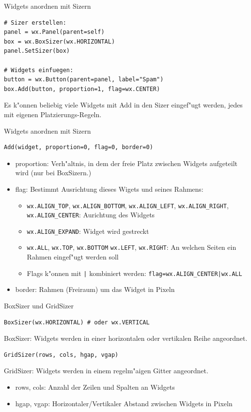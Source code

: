\begin{frame}[fragile]{Widgets anordnen mit Sizern}
\begin{lstlisting}[syle=Python]
# Sizer erstellen:
panel = wx.Panel(parent=self)
box = wx.BoxSizer(wx.HORIZONTAL)
panel.SetSizer(box)

# Widgets einfuegen:
button = wx.Button(parent=panel, label="Spam")
box.Add(button, proportion=1, flag=wx.CENTER)
\end{lstlisting}
Es k"onnen beliebig viele Widgets mit \alert{Add} in den Sizer eingef"ugt werden, jedes mit eigenen Platzierungs-Regeln.
\end{frame}


\begin{frame}[fragile]{Widgets anordnen mit Sizern}
\begin{lstlisting}[style=Python]
Add(widget, proportion=0, flag=0, border=0)
\end{lstlisting}
\begin{itemize}
\item \alert{proportion}: Verh"altnis, in dem der freie Platz zwischen Widgets aufgeteilt wird (nur bei BoxSizern.)
\item \alert{flag}: Bestimmt Ausrichtung dieses Wigets und seines Rahmens:
  \begin{itemize}
    \item \lstinline{wx.ALIGN_TOP}, \lstinline{wx.ALIGN_BOTTOM}, \lstinline{wx.ALIGN_LEFT}, \lstinline{wx.ALIGN_RIGHT}, \lstinline{wx.ALIGN_CENTER}: Aurichtung des Widgets
    \item \lstinline{wx.ALIGN_EXPAND}: Widget wird gestreckt
    \item \lstinline{wx.ALL}, \lstinline{wx.TOP}, \lstinline{wx.BOTTOM} \lstinline{wx.LEFT}, \lstinline{wx.RIGHT}: An welchen Seiten ein Rahmen eingef"ugt werden soll
    \item Flags k"onnen mit \lstinline{|} kombiniert werden: \lstinline{flag=wx.ALIGN_CENTER|wx.ALL}
  \end{itemize}
\item \alert{border}: Rahmen (Freiraum) um das Widget in Pixeln
\end{itemize}
\end{frame}

\begin{frame}[fragile]{BoxSizer und GridSizer}
\begin{lstlisting}[style=Python]
BoxSizer(wx.HORIZONTAL) # oder wx.VERTICAL
\end{lstlisting}
\alert{BoxSizer}: Widgets werden in einer horizontalen oder vertikalen Reihe angeordnet.\\[3mm]
\begin{lstlisting}[style=Python]
GridSizer(rows, cols, hgap, vgap)
\end{lstlisting}
\alert{GridSizer}: Widgets werden in einem regelm"a\3igen Gitter angeordnet.
\begin{itemize}
\item \alert{rows}, \alert{cols}: Anzahl der Zeilen und Spalten an Widgets
\item \alert{hgap}, \alert{vgap}: Horizontaler/Vertikaler Abstand zwischen Widgets in Pixeln
\end{itemize}
\end{frame}


